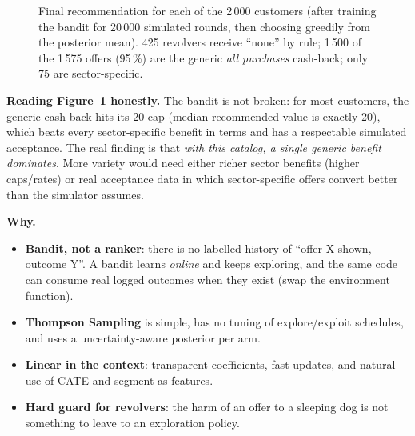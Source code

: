 \documentclass[11pt,a4paper]{article}
\newcommand{\eur}{\texttt{\texteuro}}
\newcommand{\why}[1]{\par\needspace{6\baselineskip}\smallskip\noindent\textbf{\textcolor{ca}{Why.}} #1\par}
\begin{document}
\begin{figure}[h]
\centering
{}
\caption{Final recommendation for each of the 2\,000 customers (after training the bandit for 20\,000 simulated rounds, then choosing greedily from the posterior mean). 425 revolvers receive ``none'' by rule; 1\,500 of the 1\,575 offers (95\,\%) are the generic \emph{all purchases} cash-back; only 75 are sector-specific.}
\label{fig:reco}
\end{figure}

\begin{warnbox}
\textbf{Reading Figure~\ref{fig:reco} honestly.} The bandit is not broken: for most customers, the generic cash-back hits its \eur 20 cap
(median recommended value is exactly \eur 20), which beats every sector-specific benefit in \eur terms and has a respectable simulated acceptance. The real finding is that
\emph{with this catalog, a single generic benefit dominates}. More variety would need either richer sector benefits (higher caps/rates) or real acceptance data in which
sector-specific offers convert better than the simulator assumes.
\end{warnbox}

\why{
\begin{itemize}
\item \textbf{Bandit, not a ranker}: there is no labelled history of ``offer X shown, outcome Y''. A bandit learns \emph{online} and keeps exploring, and the same code can consume real logged outcomes when they exist (swap the environment function).
\item \textbf{Thompson Sampling} is simple, has no tuning of explore/exploit schedules, and uses a uncertainty-aware posterior per arm.
\item \textbf{Linear in the context}: transparent coefficients, fast updates, and natural use of CATE and segment as features.
\item \textbf{Hard guard for revolvers}: the harm of an offer to a sleeping dog is not something to leave to an exploration policy.
\end{itemize}}
\end{document}
